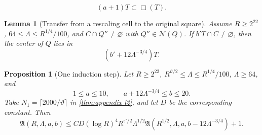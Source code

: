 \documentclass[10pt,a4paper]{amsart}
\newtheorem{lemma}{Lemma}
\newtheorem{proposition}{Proposition}
\begin{document}
\begin{equation}\label{eq:aT-in-box}
 (a+1)T\subset\Box(T).
\end{equation}

\begin{lemma}[Transfer from a rescaling cell to the original square]
\label{lem:appendix-transfer}
Assume $R\ge2^{22}$, $64\le\Lambda\le R^{1/4}/100$, and
$C\cap Q''\ne\varnothing$ with $Q''\in\mathcal N(Q)$.  If
$b'T\cap C\ne\varnothing$, then the center of $Q$ lies in
\[
 (b'+12\Lambda^{-3/4})T.
\]
\end{lemma}

\begin{proposition}[One induction step]
\label{prop:appendix-one-step}
Let $R\ge2^{22}$,
$R^{\vartheta/2}\le\Lambda\le R^{1/4}/100$, $\Lambda\ge64$, and
\[
 1\le a\le10,
 \qquad a+12\Lambda^{-3/4}\le b\le20.
\]
Take $N_1=\lceil2000/\vartheta\rceil$ in
\cref{thm:appendix-l2}, and let $D$ be the corresponding constant.  Then
\begin{equation}\label{eq:appendix-recurrence}
 \mathfrak A(R,\Lambda,a,b)
 \le C D(\log R)^4R^{\epsilon'/2}\Lambda^{1/2}
 \mathfrak A(R^{1/2},\Lambda,a,b-12\Lambda^{-3/4})+1.
\end{equation}
\end{proposition}
\end{document}
